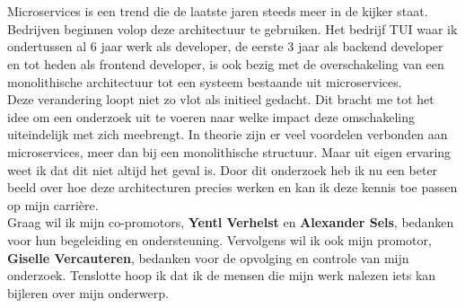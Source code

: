 
\chapter*{}
\label{ch:voorwoord}


Microservices is een trend die de laatste jaren steeds meer in de kijker staat. Bedrijven beginnen volop deze architectuur te gebruiken. Het bedrijf TUI waar ik ondertussen al 6 jaar werk als developer, de eerste 3 jaar als backend developer en tot heden als frontend developer, is ook bezig met de overschakeling van een monolithische architectuur tot een systeem bestaande uit microservices.\\
Deze verandering loopt niet zo vlot als initieel gedacht. Dit bracht me tot het idee om een onderzoek uit te voeren naar welke impact deze omschakeling uiteindelijk met zich meebrengt. In theorie zijn er veel voordelen verbonden aan microservices, meer dan bij een monolithische structuur. Maar uit eigen ervaring weet ik dat dit niet altijd het geval is. Door dit onderzoek heb ik nu een beter beeld over hoe deze architecturen precies werken en kan ik deze kennis toe passen op mijn carrière.\\  
Graag wil ik mijn co-promotors, \textbf{Yentl Verhelst} en \textbf{Alexander Sels}, bedanken voor hun begeleiding en ondersteuning. Vervolgens wil ik ook mijn promotor, \textbf{Giselle Vercauteren}, bedanken voor de opvolging en controle van mijn onderzoek. Tenslotte hoop ik dat ik de mensen die mijn werk nalezen iets kan bijleren over mijn onderwerp.
